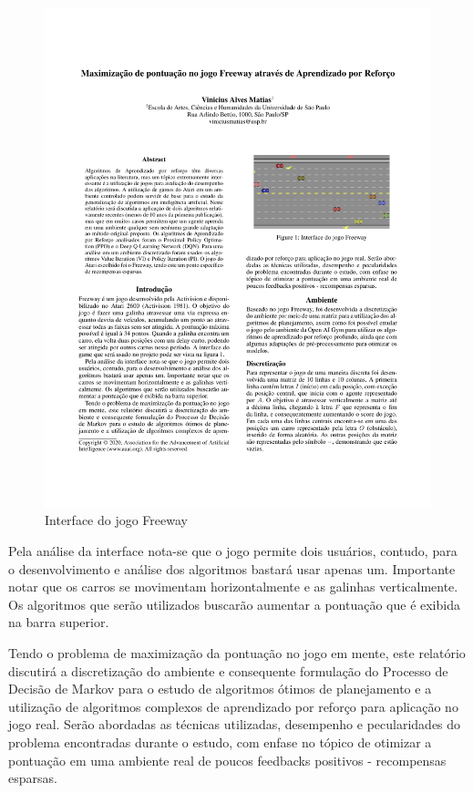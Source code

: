 \documentclass[letterpaper]{article} %
\begin{document}
\begin{figure}[h]
\centering
\includegraphics[width=0.9\columnwidth]{freeway}
\caption{Interface do jogo Freeway}
\label{freeway}
\end{figure}

Pela análise da interface nota-se que o jogo permite dois usuários, contudo, para o desenvolvimento e análise dos algoritmos bastará usar apenas um. Importante notar que os carros se movimentam horizontalmente e as galinhas verticalmente. Os algoritmos que serão utilizados buscarão aumentar a pontuação que é exibida na barra superior.

Tendo o problema de maximização da pontuação no jogo em mente, este relatório discutirá a discretização do ambiente e consequente formulação do Processo de Decisão de Markov para o estudo de algoritmos ótimos de planejamento e a utilização de algoritmos complexos de aprendizado por reforço para aplicação no jogo real. Serão abordadas as técnicas utilizadas, desempenho e pecularidades do problema encontradas durante o estudo, com enfase no tópico de otimizar a pontuação em uma ambiente real de poucos feedbacks positivos - recompensas esparsas.
\end{document}
